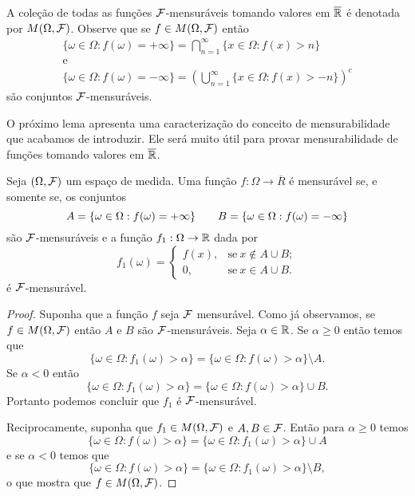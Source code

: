 A coleção de todas as funções $\mathcal{F}$-mensuráveis 
tomando valores em $\overline{\mathbb{R}}$ é denotada por
$M(\Omega,\mathcal{F})$. Observe que se $f\in M(\Omega,\mathcal{F})$
então 
%
\[
\begin{array}{c}
	\displaystyle
	\{ \omega\in\Omega: f(\omega)=+\infty \}
	=
	\bigcap_{n=1}^{\infty} \{x\in\Omega: f(x)>n\}
	\\[0.3cm]
	\text{e}
	\\[0.3cm]
	\displaystyle
	\{ \omega\in\Omega: f(\omega)=-\infty \}
	=
	\left( 
		\bigcup_{n=1}^{\infty} \{x\in\Omega: f(x)>-n\}
	\right)^c
\end{array}
\]
são conjuntos $\mathcal{F}$-mensuráveis.



O próximo lema apresenta uma caracterização 
do conceito de mensurabilidade que acabamos de introduzir.
Ele será muito útil para provar mensurabilidade de funções
tomando valores em $\overline{\mathbb{R}}$. 


\begin{lema}\label{lema-truncamento-func-mensuravel-eh-mensuravel}
	Seja $(\Omega,\mathcal{F})$ um espaço de medida. 
	Uma função $f:\Omega\to\overline{R}$ é 
	mensurável se, e somente se, os conjuntos 
	\[
	A=\{ \omega\in\Omega: f(\omega)=+\infty \}
	\quad
	\text
	\quad
	B=\{ \omega\in\Omega: f(\omega)=-\infty \}	
	\]
	são $\mathcal{F}$-mensuráveis e a função  
	$f_{1}:\Omega\to\mathbb{R}$ dada por 
	\[
	f_1(\omega)=
		\begin{cases}
			f(x),&\text{se}\ x\notin A\cup B;
			\\
			0,&\text{se}\ x\in A\cup B.
		\end{cases}
	\]
	é $\mathcal{F}$-mensurável.
\end{lema}



\begin{proof}
Suponha que a função $f$ seja $\mathcal{F}$ mensurável. 
Como já observamos, se $f\in M(\Omega,\mathcal{F})$ então $A$ e $B$ 
são $\mathcal{F}$-mensuráveis. Seja $\alpha\in \mathbb{R}$. Se $\alpha\geq 0$
então temos que 
\[
	\{\omega\in\Omega:f_1(\omega)>\alpha\}
	=
	\{\omega\in\Omega:f(\omega)>\alpha\}
	\setminus A.	
\] 
Se $\alpha<0$ então 
\[	
	\{\omega\in\Omega:f_1(\omega)>\alpha\}
	=
	\{\omega\in\Omega:f(\omega)>\alpha\}
	\cup B.	
\]
Portanto podemos concluir que $f_1$ é $\mathcal{F}$-mensurável.


Reciprocamente, suponha que $f_1\in M(\Omega,\mathcal{F})$ e $A,B\in\mathcal{F}$.
Então para $\alpha\geq 0$ temos
\[
	\{\omega\in\Omega:f(\omega)>\alpha\}
	=
	\{\omega\in\Omega:f_1(\omega)>\alpha\}
	\cup A	
\] 
e se $\alpha<0$ temos que
\[
	\{\omega\in\Omega:f(\omega)>\alpha\}
	=
	\{\omega\in\Omega:f_1(\omega)>\alpha\}
	\setminus B,	
\] 
o que mostra que $f\in M(\Omega,\mathcal{F})$.
\end{proof}



